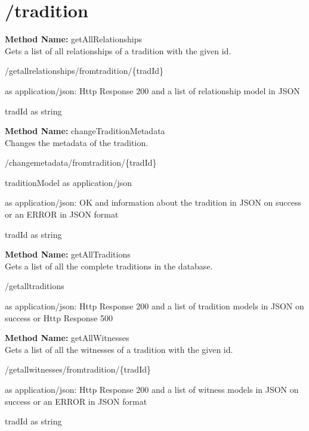 \section{/tradition}
\textbf{Method Name: }getAllRelationships \\ Gets a list of all relationships of a tradition with the given id.
\begin{get}
/getallrelationships/fromtradition/\{tradId\}
\end{get}
\begin{response}
 as application/json: Http Response 200 and a list of relationship model in JSON
\end{response}
\begin{parameter}
tradId as string
\end{parameter}
\textbf{Method Name: }changeTraditionMetadata \\ Changes the metadata of the tradition.
\begin{post}
/changemetadata/fromtradition/\{tradId\}
\end{post}
\begin{request}
traditionModel as application/json
\end{request}
\begin{response}
 as application/json: OK and information about the tradition in JSON on success or an ERROR in JSON format
\end{response}
\begin{parameter}
tradId as string
\end{parameter}
\textbf{Method Name: }getAllTraditions \\ Gets a list of all the complete traditions in the database.
\begin{get}
/getalltraditions
\end{get}
\begin{response}
 as application/json: Http Response 200 and a list of tradition models in JSON on success or Http Response 500
\end{response}
\textbf{Method Name: }getAllWitnesses \\ Gets a list of all the witnesses of a tradition with the given id.
\begin{get}
/getallwitnesses/fromtradition/\{tradId\}
\end{get}
\begin{response}
 as application/json: Http Response 200 and a list of witness models in JSON on success or an ERROR in JSON format
\end{response}
\begin{parameter}
tradId as string
\end{parameter}
